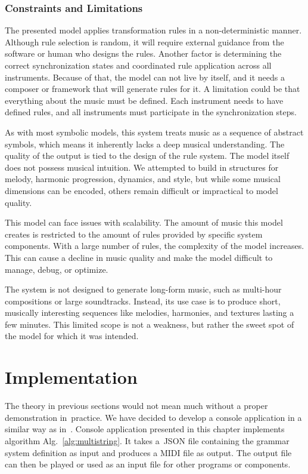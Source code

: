 \subsection*{Constraints and Limitations}
The presented model applies transformation rules in a non-deterministic manner. Although rule selection is random, it will require external guidance from the software or human who designs the rules. Another factor is determining the correct synchronization states and coordinated rule application across all instruments. Because of that, the model can not live by itself, and it needs a composer or framework that will generate rules for it. A limitation could be that everything about the music must be defined. Each instrument needs to have defined rules, and all instruments must participate in the synchronization steps. 

As with most symbolic models, this system treats music as a sequence of abstract symbols, which means it inherently lacks a deep musical understanding. The quality of the output is tied to the design of the rule system. The model itself does not possess musical intuition. We attempted to build in structures for melody, harmonic progression, dynamics, and style, but while some musical dimensions can be encoded, others remain difficult or impractical to model quality.

This model can face issues with scalability. The amount of music this model creates is restricted to the amount of rules provided by specific system components. With a large number of rules, the complexity of the model increases. This can cause a decline in music quality and make the model difficult to manage, debug, or optimize.

The system is not designed to generate long-form music, such as multi-hour compositions or large soundtracks. Instead, its use case is to produce short, musically interesting sequences like melodies, harmonies, and textures lasting a few minutes. This limited scope is not a weakness, but rather the sweet spot of the model for which it was intended.

\chapter{Implementation}
\label{chap5}
The theory in previous sections would not mean much without a proper demonstration in~practice. We have decided to develop a console application in a similar way as in~\cite{eibensteiner2018procedural}. Console application presented in this chapter implements algorithm Alg.~\ref{alg:multistring}. It takes a~JSON file containing the grammar system definition as input and produces a MIDI file as output. 
The output file can then be played or used as an input file for other programs or components.


